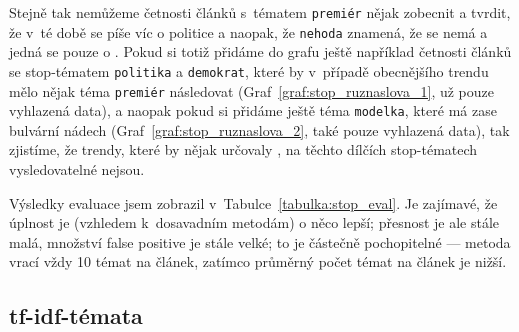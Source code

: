 \documentclass[12pt,a4paper]{report}
\begin{document}
Stejně tak nemůžeme četnosti článků s~tématem \texttt{premiér} nějak zobecnit a tvrdit, že v~té době se píše víc o politice a naopak, že \texttt{nehoda} znamená, že se nemá  a jedná se pouze o . Pokud si totiž přidáme do grafu ještě například četnosti článků se stop-tématem \texttt{politika} a \texttt{demokrat}, které by v~případě obecnějšího trendu mělo nějak téma \texttt{premiér} následovat (Graf~\ref{graf:stop_ruznaslova_1}, už pouze vyhlazená data), a naopak pokud si přidáme ještě téma \texttt{modelka}, které má zase bulvární nádech (Graf~\ref{graf:stop_ruznaslova_2}, také pouze vyhlazená data), tak zjistíme, že trendy, které by nějak určovaly , na těchto dílčích stop-tématech vysledovatelné nejsou. 



Výsledky evaluace jsem zobrazil v~Tabulce~\ref{tabulka:stop_eval}. Je zajímavé, že úplnost je (vzhledem k~dosavadním metodám) o něco lepší; přesnost je ale stále malá, množství false positive je stále velké; to je částečně pochopitelné --- metoda vrací vždy 10 témat na článek, zatímco průměrný počet témat na článek je nižší.

\subsection{tf-idf-témata}
\end{document}
